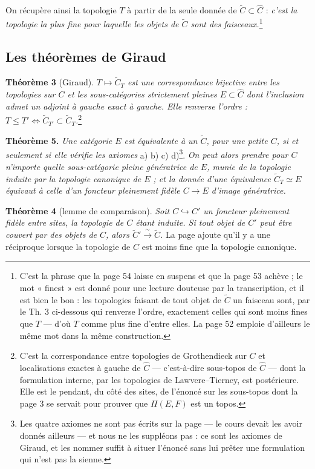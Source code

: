 \documentclass[11pt,a4paper]{article}
\begin{document}
On récupère ainsi la topologie $T$ à partir de la seule donnée de
$\widetilde{C} \subset \widehat{C}$ : \emph{c'est la topologie la plus fine
pour laquelle les objets de $\widetilde{C}$ sont des faisceaux.}\footnote{C'est
la phrase que la page 54 laisse en suspens et que la page 53 achève ; le mot
« finest » est donné pour une lecture douteuse par la transcription, et il est
bien le bon : les topologies faisant de tout objet de $\widetilde{C}$ un
faisceau sont, par le Th. 3 ci-dessous qui renverse l'ordre, exactement celles
qui sont moins fines que $T$ — d'où $T$ comme plus fine d'entre elles. La
page 52 emploie d'ailleurs le même mot dans la même construction.}

\subsection*{Les théorèmes de Giraud}

\textbf{Théorème 3} (Giraud). \emph{$T \mapsto \widetilde{C}_{T}$ est une
correspondance bijective entre les topologies sur $C$ et les sous-catégories
strictement pleines $E \subset \widehat{C}$ dont l'inclusion admet un adjoint à
gauche exact à gauche. Elle renverse l'ordre :
$T \leq T' \iff \widetilde{C}_{T'} \subset \widetilde{C}_{T}$.}\footnote{C'est
la correspondance entre topologies de Grothendieck sur $C$ et localisations
exactes à gauche de $\widehat{C}$ — c'est-à-dire sous-topos de $\widehat{C}$ —
dont la formulation interne, par les topologies de Lawvere--Tierney, est
postérieure. Elle est le pendant, du côté des sites, de l'énoncé sur les
sous-topos dont la page 3 se servait pour prouver que $\Pi(E,F)$ est un topos.}

\textbf{Théorème 5.} \emph{Une catégorie $E$ est équivalente à un
$\widetilde{C}$, pour une petite $C$, si et seulement si elle vérifie les
axiomes} a) b) c) d)\footnote{Les quatre axiomes ne sont pas écrits sur la
page — le cours devait les avoir donnés ailleurs — et nous ne les suppléons
pas : ce sont les axiomes de Giraud, et les nommer suffit à situer l'énoncé
sans lui prêter une formulation qui n'est pas la sienne.}. \emph{On peut alors
prendre pour $C$ n'importe quelle sous-catégorie pleine génératrice de $E$,
munie de la topologie induite par la topologie canonique de $E$ ; et la donnée
d'une équivalence $\widetilde{C}_{T} \simeq E$ équivaut à celle d'un foncteur
pleinement fidèle $C \to E$ d'image génératrice.}

\textbf{Théorème 4} (lemme de comparaison). \emph{Soit $C \hookrightarrow C'$
un foncteur pleinement fidèle entre sites, la topologie de $C$ étant induite. Si
tout objet de $C'$ peut être couvert par des objets de $C$, alors
$\widetilde{C}' \xrightarrow{\ \sim\ } \widetilde{C}$.} La page ajoute qu'il y a
une réciproque lorsque la topologie de $C$ est moins fine que la topologie
canonique.
\end{document}
